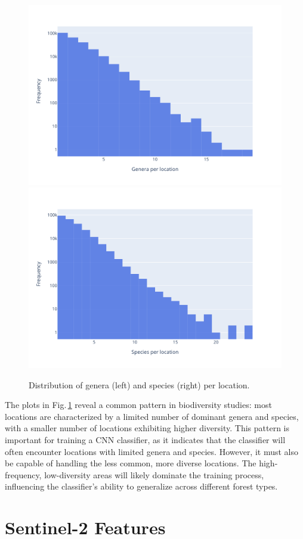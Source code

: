 \begin{figure}[!thb]
    \centering

    \includegraphics[width=0.48\linewidth, trim={0 0 2cm 0}]{figures/figures_labels/grouped_genus.pdf}%
    \includegraphics[width=0.48\linewidth, trim={0 0 2cm 0}]{figures/figures_labels/grouped_species.pdf}

    \caption{Distribution of genera (left) and species (right) per location.}
    \label{fig:grouped_histograms}
\end{figure}
 
The plots in Fig.\,\ref{fig:grouped_histograms} reveal a common pattern in biodiversity studies: most locations are characterized by a limited number of dominant genera and species, with a smaller number of locations exhibiting higher diversity. This pattern is important for training a CNN classifier, as it indicates that the classifier will often encounter locations with limited genera and species. However, it must also be capable of handling the less common, more diverse locations. The high-frequency, low-diversity areas will likely dominate the training process, influencing the classifier's ability to generalize across different forest types.

\section{Sentinel-2 Features}

